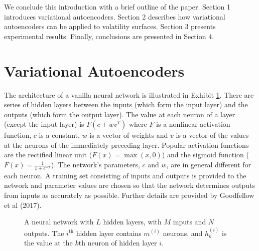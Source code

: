 \documentclass[12pt]{article}
\begin{document}

We conclude this introduction with a brief outline of the paper. Section 1 introduces variational autoencoders. Section 2 describes how variational autoencoders can be applied to volatility surfaces. Section 3 presents experimental results. Finally, conclusions are presented in Section 4.



\section{Variational Autoencoders}
The architecture of a vanilla neural network is illustrated in Exhibit \ref{fig:neural-net}. There are series of hidden layers between the inputs (which form the input layer) and the outputs (which form the output layer). The value at each neuron of a layer (except the input layer) is $F(c+wv^T)$ where $F$ is a nonlinear activation function, $c$ is a constant, $w$ is a vector of weights and $v$ is a vector of the values at the neurons of the immediately preceding layer.  Popular activation functions are the rectified linear unit ($F(x)=\max(x,0)$) and the sigmoid function ($F(x)=\frac{1}{1+e^{-x}}$). The network's parameters, $c$ and $w$, are in general different for each neuron. A training set consisting of inputs and outputs is provided to the network and parameter values are chosen so that the network determines outputs from inputs as accurately as possible. Further details are provided by Goodfellow et al (2017). 

\begin{figure}[h!]
  \centering
  
  \caption{A neural network with $L$ hidden layers, with $M$ inputs and $N$ outputs. The $i^{\text{th}}$ hidden layer contains $m^{(i)}$ neurons, and $h^{(i)}_k$ is the value at the $k$th neuron of hidden layer $i$.}
  \label{fig:neural-net}
\end{figure}
\end{document}
